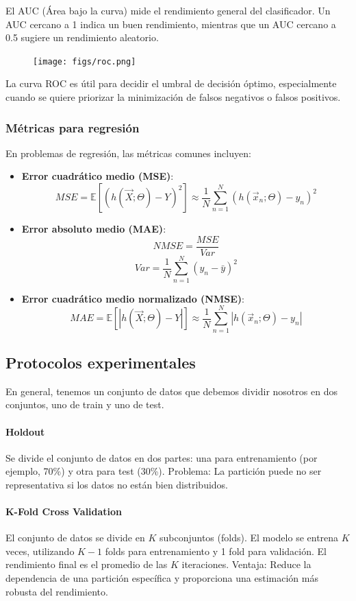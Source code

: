 El AUC (Área bajo la curva) mide el rendimiento general del clasificador. Un AUC cercano a 1 indica un buen rendimiento, mientras que un AUC cercano a 0.5 sugiere un rendimiento aleatorio.

\begin{figure}[h]
\centering
\texttt{[image: figs/roc.png]}
\end{figure}

La curva ROC es útil para decidir el umbral de decisión óptimo, especialmente cuando se quiere priorizar la minimización de falsos negativos o falsos positivos.

\subsubsection{Métricas para regresión}
En problemas de regresión, las métricas comunes incluyen:
\begin{itemize}
\item \textbf{Error cuadrático medio (MSE)}:
$$MSE = \mathbb{E}[(h(\vec{X}; \Theta) - Y)^2] \approx \frac{1}{N} \sum^N_{n = 1}(h(\vec{x}_n;\Theta) - y_n)^2$$

\item \textbf{Error absoluto medio (MAE)}:
$$NMSE = \frac{MSE}{Var}$$
$$Var = \frac{1}{N} \sum^N_{n = 1} (y_n - \bar{y})^2$$

\item \textbf{Error cuadrático medio normalizado (NMSE)}:
$$MAE = \mathbb{E}[|h(\vec{X};\Theta) - Y|] \approx \frac{1}{N} \sum^N_{n = 1} |h(\vec{x}_n; \Theta) - y_n|$$
\end{itemize}

\subsection{Protocolos experimentales}
En general, tenemos un conjunto de datos que debemos dividir nosotros en dos conjuntos, uno de train y uno de test. 

\paragraph{Holdout}
Se divide el conjunto de datos en dos partes: una para entrenamiento (por ejemplo, 70\%) y otra para test (30\%). Problema: La partición puede no ser representativa si los datos no están bien distribuidos.

\paragraph{K-Fold Cross Validation}
El conjunto de datos se divide en $K$ subconjuntos (folds). El modelo se entrena $K$ veces, utilizando 
$K-1$ folds para entrenamiento y 1 fold para validación. El rendimiento final es el promedio de las $K$ iteraciones. Ventaja: Reduce la dependencia de una partición específica y proporciona una estimación más robusta del rendimiento.

